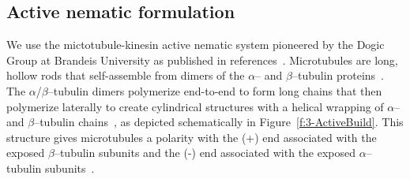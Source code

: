 \subsection{Active nematic formulation}
We use the mictotubule-kinesin active nematic system pioneered by the Dogic Group at Brandeis University as published in references~\cite{RN3,RN27,RN9,RN135,RN134}.
Microtubules are long, hollow rods that self-assemble from dimers of the $\alpha$-- and $\beta$--tubulin proteins~\cite{RN248}.
The $\alpha$/$\beta$--tubulin dimers polymerize end-to-end to form long chains that then polymerize laterally to create cylindrical structures with a helical wrapping of $\alpha$-- and $\beta$--tubulin chains~\cite{RN248,RN249}, as depicted schematically in Figure~\ref{f:3-ActiveBuild}.
This structure gives microtubules a polarity with the (+) end associated with the exposed $\beta$--tubulin subunits and the (-) end associated with the exposed $\alpha$--tubulin subunits~\cite{RN248,RN249}.

